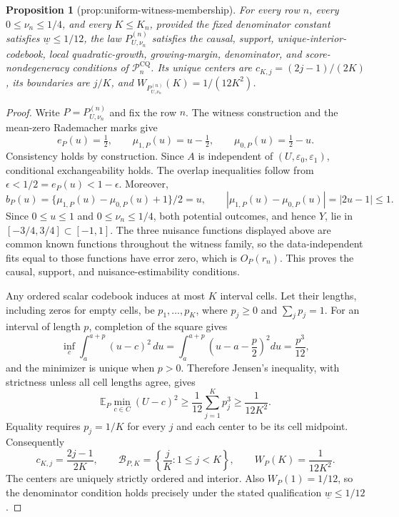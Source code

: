 \documentclass{article}
\newtheorem{proposition}{Proposition}
\begin{document}
\begin{proposition}[prop:uniform-witness-membership]\label{prop:uniform-witness-membership}
For every row \(n\), every \(0\leq\nu_n\leq1/4\), and every \(K\leq K_n\), provided the fixed denominator constant satisfies \(\underline w\leq1/12\), the law \(P_{U,\nu_n}^{(n)}\) satisfies the causal, support, unique-interior-codebook, local quadratic-growth, growing-margin, denominator, and score-nondegeneracy conditions of \(\mathcal P_n^{\mathrm{CQ}}\). Its unique centers are \(c_{K,j}=(2j-1)/(2K)\), its boundaries are \(j/K\), and \(W_{P_{U,\nu_n}^{(n)}}(K)=1/(12K^2)\).
\end{proposition}
\begin{proof}
Write \(P=P_{U,\nu_n}^{(n)}\) and fix the row \(n\).  The witness construction and the mean-zero Rademacher marks give
\[
 e_P(u)=\tfrac12,\qquad
 \mu_{1,P}(u)=u-\tfrac12,\qquad
 \mu_{0,P}(u)=\tfrac12-u .
\]
Consistency holds by construction.  Since \(A\) is independent of \((U,\varepsilon_0,\varepsilon_1)\), conditional exchangeability holds.  The overlap inequalities follow from \(\epsilon<1/2=e_P(u)<1-\epsilon\).  Moreover,
\[
 b_P(u)=\{\mu_{1,P}(u)-\mu_{0,P}(u)+1\}/2=u,
 \qquad |\mu_{1,P}(u)-\mu_{0,P}(u)|=|2u-1|\leq1.
\]
Since \(0\leq u\leq1\) and \(0\leq\nu_n\leq1/4\), both potential outcomes, and hence \(Y\), lie in \([-3/4,3/4]\subset[-1,1]\).  The three nuisance functions displayed above are common known functions throughout the witness family, so the data-independent fits equal to those functions have error zero, which is \(O_P(r_n)\).  This proves the causal, support, and nuisance-estimability conditions.

Any ordered scalar codebook induces at most \(K\) interval cells.  Let their lengths, including zeros for empty cells, be \(p_1,\ldots,p_K\), where \(p_j\geq0\) and \(\sum_jp_j=1\).  For an interval of length \(p\), completion of the square gives
\[
 \inf_c\int_a^{a+p}(u-c)^2\,du
 =\int_a^{a+p}\left(u-a-\frac p2\right)^2du
 =\frac{p^3}{12},
\]
and the minimizer is unique when \(p>0\).  Therefore Jensen's inequality, with strictness unless all cell lengths agree, gives
\[
 \mathbb E_P\min_{c\in C}(U-c)^2
 \geq \frac1{12}\sum_{j=1}^Kp_j^3
 \geq\frac1{12K^2}.
\]
Equality requires \(p_j=1/K\) for every \(j\) and each center to be its cell midpoint.  Consequently
\[
 c_{K,j}=\frac{2j-1}{2K},\qquad
 \mathcal B_{P,K}=\left\{\frac jK:1\leq j<K\right\},
 \qquad W_P(K)=\frac1{12K^2}.
\]
The centers are uniquely strictly ordered and interior.  Also \(W_P(1)=1/12\), so the denominator condition holds precisely under the stated qualification \(\underline w\leq1/12\).


\end{proof}
\end{document}

